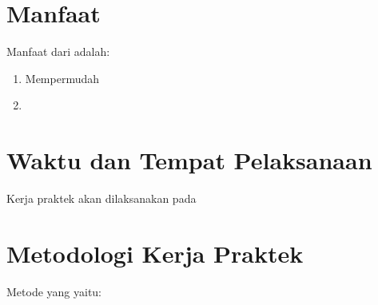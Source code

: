 \section{Manfaat}
\vspace{1ex}

Manfaat dari \lipsum[1][1] adalah:
\vspace{0.5ex}

\begin{enumerate}[nolistsep]

  \item Mempermudah \lipsum[1][1-2]
  \vspace{0.5ex}

  \item \lipsum[1][3-4]
  \vspace{0.5ex}

\end{enumerate}
\vspace{0.5ex}

\section{Waktu dan Tempat Pelaksanaan}
\vspace{1ex}

Kerja praktek akan dilaksanakan pada \lipsum[1][1-3]
\vspace{0.5ex}

\newpage

\section{Metodologi Kerja Praktek}
\vspace{1ex}

Metode yang \lipsum[1][1] yaitu:
\vspace{0.5ex}


